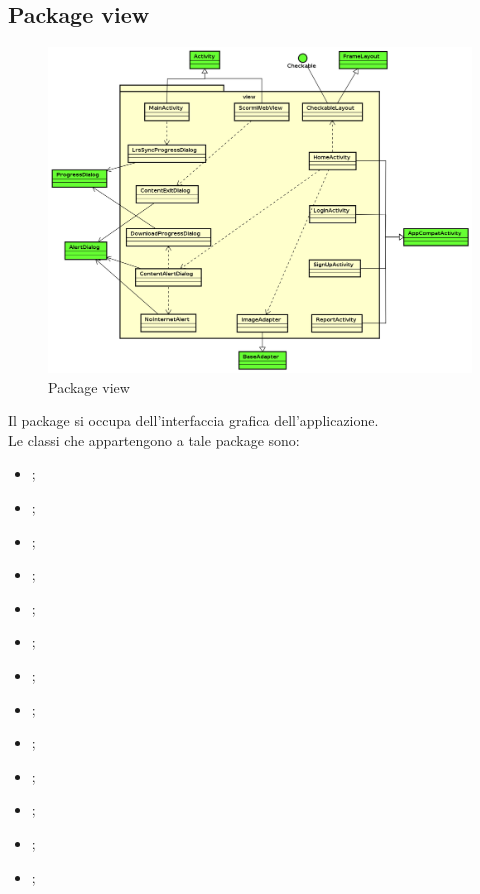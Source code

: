 \documentclass[../Tesi.tex]{subfiles}
\begin{document}
	\subsection{Package view}
		\begin{figure}[H]
			\centering
			\includegraphics[scale=0.4]{images/package_diagrams/view}
				\caption{Package view}
		\end{figure}
		Il package  si occupa dell'interfaccia grafica dell'applicazione. \\
		Le classi che appartengono a tale package sono:
		\begin{itemize}
			\item {};
			\item {};
			\item {};
			\item {};
			\item {};
			\item {};
			\item {};
			\item {};
			\item {};
			\item {};
			\item {};
			\item {};
			\item {};
		\end{itemize}
\end{document}
